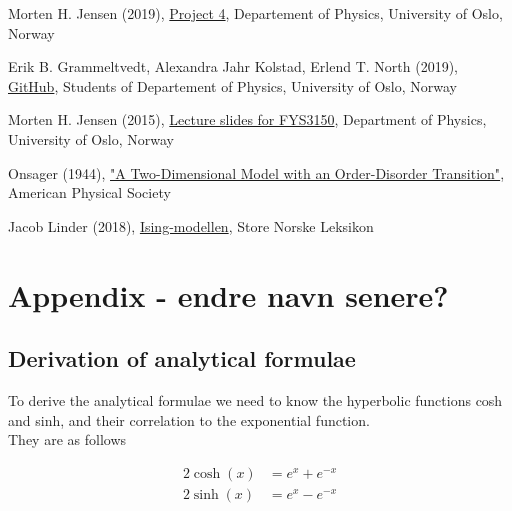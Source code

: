 \documentclass{article}
\begin{document}
\begin{thebibliography}{}

Morten H. Jensen (2019), \href{https://github.com/CompPhysics/ComputationalPhysics/blob/master/doc/Projects/2019/Project4/pdf/Project4.pdf}{Project 4}, Departement of Physics, University of Oslo, Norway

Erik B. Grammeltvedt, Alexandra Jahr Kolstad, Erlend T. North (2019), \href{https://github.com/Erikbgram/Fys3150}{GitHub}, Students of Departement of Physics, University of Oslo, Norway

Morten H. Jensen (2015), \href{https://github.com/CompPhysics/ComputationalPhysics/blob/master/doc/Lectures/lectures2015.pdf}{Lecture slides for FYS3150}, Department of Physics, University of Oslo, Norway

Onsager (1944), \href{https://journals.aps.org/pr/abstract/10.1103/PhysRev.65.117}{"A Two-Dimensional Model with an Order-Disorder Transition"}, American Physical Society

Jacob Linder (2018), \href{https://snl.no/Ising-modellen}{Ising-modellen}, Store Norske Leksikon \\

\end{thebibliography}


\vspace{1cm}


\appendix
\section{Appendix - endre navn senere?} \label{sec:Appendix}


\subsection{Derivation of analytical formulae}

To derive the analytical formulae we need to know the hyperbolic functions cosh and sinh, and their correlation to the exponential function. \\

They are as follows

\begin{align*}
    2 \cosh (x) &= e^x + e^{-x} \\
    2 \sinh (x) &= e^x - e^{-x}
\end{align*} \\
\end{document}
